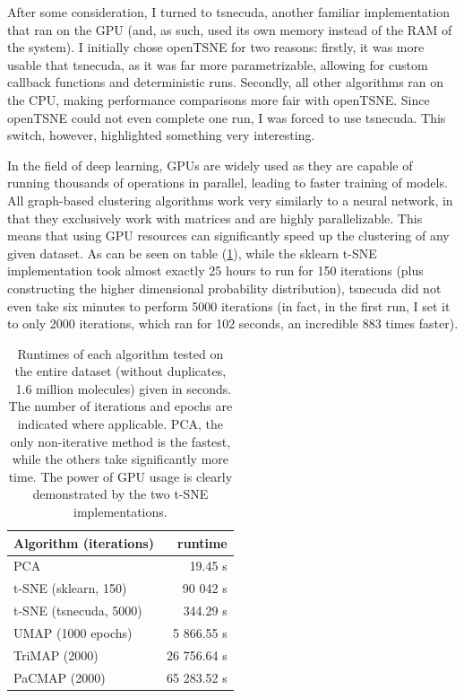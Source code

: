 After some consideration, I turned to tsnecuda, another familiar implementation that ran on the GPU (and, as such, used its own memory instead of the RAM of the system). I initially chose openTSNE for two reasons: firstly, it was more usable that tsnecuda, as it was far more parametrizable, allowing for custom callback functions and deterministic runs. Secondly, all other algorithms ran on the CPU, making performance comparisons more fair with openTSNE. Since openTSNE could not even complete one run, I was forced to use tsnecuda. This switch, however, highlighted something very interesting.

In the field of deep learning, GPUs are widely used as they are capable of running thousands of operations in parallel, leading to faster training of models. All graph-based clustering algorithms work very similarly to a neural network, in that they exclusively work with matrices and are highly parallelizable. This means that using GPU resources can significantly speed up the clustering of any given dataset. As can be seen on table (\ref{tab:runtime}), while the sklearn t-SNE implementation took almost exactly 25 hours to run for 150 iterations (plus constructing the higher dimensional probability distribution), tsnecuda did not even take six minutes to perform 5000 iterations (in fact, in the first run, I set it to only 2000 iterations, which ran for 102 seconds, an incredible 883 times faster).

\begin{table}[htb]
	\begin{center}
		\begin{tabular}{|l|r|}
			\hline
			Algorithm (iterations) & runtime \\
			\hline
			PCA & 19.45 s \\
			\hline
			t-SNE (sklearn, 150) & 90 042 s \\
			\hline
			t-SNE (tsnecuda, 5000) & 344.29 s \\
			\hline
			UMAP (1000 epochs) & 5 866.55 s \\
			\hline
			TriMAP (2000) & 26 756.64 s \\
			\hline
			PaCMAP (2000) & 65 283.52 s \\
			\hline
		\end{tabular}
	\end{center}
	\caption{Runtimes of each algorithm tested on the entire dataset (without duplicates, ~1.6 million molecules) given in seconds. The number of iterations and epochs are indicated where applicable. PCA, the only non-iterative method is the fastest, while the others take significantly more time. The power of GPU usage is clearly demonstrated by the two t-SNE implementations.}
	\label{tab:runtime}
\end{table}

